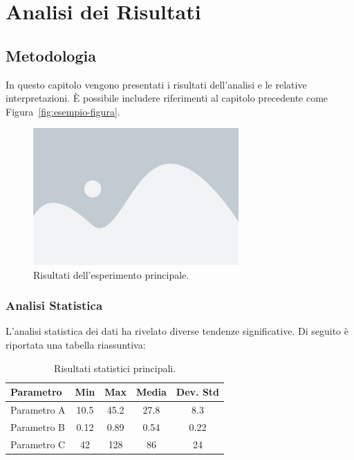 \chapter{Analisi dei Risultati}

\section{Metodologia}

In questo capitolo vengono presentati i risultati dell'analisi e le relative interpretazioni. È possibile includere riferimenti al capitolo precedente come Figura~\ref{fig:esempio-figura}.

\begin{figure}[htbp]
    \centering
    \includegraphics[width=0.7\textwidth]{immagini/placeholder-figure.png}
    \caption{Risultati dell'esperimento principale.}
    \label{fig:risultati-esperimento}
\end{figure}

\subsection{Analisi Statistica}

L'analisi statistica dei dati ha rivelato diverse tendenze significative. Di seguito è riportata una tabella riassuntiva:

\begin{table}[htbp]
    \centering
    \caption{Risultati statistici principali.}
    \label{tab:statistiche}
    \begin{tabular}{lcccc}
        \toprule
        \textbf{Parametro} & \textbf{Min} & \textbf{Max} & \textbf{Media} & \textbf{Dev. Std} \\
        \midrule
        Parametro A & 10.5 & 45.2 & 27.8 & 8.3 \\
        Parametro B & 0.12 & 0.89 & 0.54 & 0.22 \\
        Parametro C & 42 & 128 & 86 & 24 \\
        \bottomrule
    \end{tabular}
\end{table}

